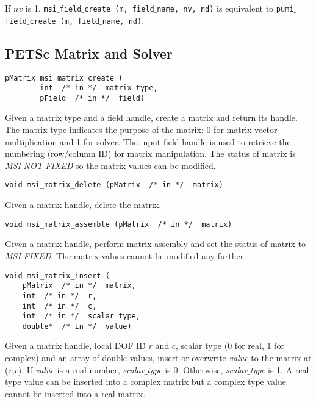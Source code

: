  If $nv$ is 1, \texttt{msi$\_$field$\_$create (m, field$\_$name, nv, nd)} is equivalent to \texttt{pumi$\_$field$\_$create (m, field$\_$name, nd)}.

\subsection{PETSc Matrix and Solver}

\begin{verbatim}
pMatrix msi_matrix_create (
        int  /* in */  matrix_type,
        pField  /* in */  field)
\end{verbatim}\vspace{-.5cm}\hspace{1cm}
Given a matrix type and a field handle, create a matrix and return its handle. The matrix type indicates the purpose of the matrix: 0 for matrix-vector multiplication and 1 for solver. The input field handle is used to retrieve the numbering (row/column ID) for matrix manipulation. The status of matrix is \textit{MSI$\_$NOT$\_$FIXED} so the matrix values can be modified.

\begin{verbatim}
void msi_matrix_delete (pMatrix  /* in */  matrix)
\end{verbatim}\vspace{-.5cm}\hspace{1cm}
Given a matrix handle, delete the matrix. 
	    
\begin{verbatim}
void msi_matrix_assemble (pMatrix  /* in */  matrix)
\end{verbatim}\vspace{-.5cm}\hspace{1cm}
Given a matrix handle, perform matrix assembly and set the status of matrix  to \textit{MSI$\_$FIXED}. 
The matrix values cannot be modified any further.

\begin{verbatim}
void msi_matrix_insert (
    pMatrix  /* in */  matrix, 
    int  /* in */  r, 
    int  /* in */  c, 
    int  /* in */  scalar_type,
    double*  /* in */  value)
\end{verbatim}\vspace{-.5cm}\hspace{1cm}
Given a matrix handle, local DOF ID $r$ and $c$, scalar type (0 for real, 1 for complex) and an array of double values, insert or overwrite \textit{value} to the matrix at (\textit{r},\textit{c}). If \textit{value} is a real number, \textit{scalar$\_$type} is 0. Otherwise, \textit{scalar$\_$type} is 1. A real type value can be inserted into a complex matrix but a complex type value cannot be inserted into a real matrix.   

